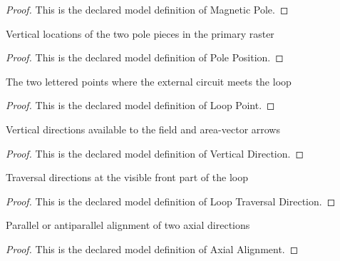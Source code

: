 \begin{proof}
  This is the declared model definition of Magnetic Pole.
\end{proof}
\begin{definition}
  \label{def:physics:phyx-mini-0917:phyxminiproblems-problemphyxmini0917-poleposition}
  Vertical locations of the two pole pieces in the primary raster
\end{definition}
\begin{proof}
  This is the declared model definition of Pole Position.
\end{proof}
\begin{definition}
  \label{def:physics:phyx-mini-0917:phyxminiproblems-problemphyxmini0917-looppoint}
  The two lettered points where the external circuit meets the loop
\end{definition}
\begin{proof}
  This is the declared model definition of Loop Point.
\end{proof}
\begin{definition}
  \label{def:physics:phyx-mini-0917:phyxminiproblems-problemphyxmini0917-verticaldirection}
  Vertical directions available to the field and area-vector arrows
\end{definition}
\begin{proof}
  This is the declared model definition of Vertical Direction.
\end{proof}
\begin{definition}
  \label{def:physics:phyx-mini-0917:phyxminiproblems-problemphyxmini0917-looptraversaldirection}
  Traversal directions at the visible front part of the loop
\end{definition}
\begin{proof}
  This is the declared model definition of Loop Traversal Direction.
\end{proof}
\begin{definition}
  \label{def:physics:phyx-mini-0917:phyxminiproblems-problemphyxmini0917-axialalignment}
  Parallel or antiparallel alignment of two axial directions
\end{definition}
\begin{proof}
  This is the declared model definition of Axial Alignment.
\end{proof}
